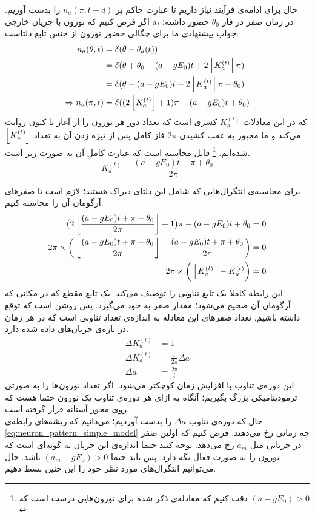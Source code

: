 حال برای ادامه‌ی فرآیند نیاز داریم تا عبارت حاکم بر 
$n_a(\pi,t-d)$
را بدست آوریم. اگر فرض کنیم که نورون با جریان خارجی a، در زمان صفر در فاز
$\theta_0$
حضور داشته؛ جواب پیشنهادی ما برای چگالی حضور نورون از جنس تابع دلتاست:
\begin{align}
	n_a(\theta,t) &= \delta(\theta - \theta_a(t)) \\
	&= \delta(\theta + \theta_0 - (a - g E_0)t + 2 \left\lfloor K^{(t)}_a \right\rfloor\pi )\\
	&= \delta( \theta - (a - g E_0)t + 2 \left\lfloor K^{(t)}_a \right\rfloor \pi + \theta_0  )\\
	\Rightarrow n_a(\pi,t) &= \delta(  (2\left\lfloor K^{(t)}_a \right\rfloor + 1)\pi - (a - g E_0)t + \theta_0   )\\
\end{align}
که در این معادلات 
$K^{(t)}_a$
کسری است که تعداد دور هر نورون را از آغاز تا کنون روایت می‌کند و ما مجبور به عقب کشیدن 
$2\pi$
فاز کامل پس از تیزه زدن آن به تعداد 
$\left\lfloor K^{(t)}_a \right\rfloor$
شده‌ایم.
\footnote{دقت کنیم که معادله‌ی ذکر شده برای نورون‌هایی درست است که 
	$(a - g E_0) > 0 $
}
قابل محاسبه است که عبارت کامل آن به صورت زیر است.
\begin{equation}
	K^{(t)}_a = \frac{(a - gE_0)t + \pi + \theta_0}{2\pi}
\end{equation}

برای محاسبه‌ی انتگرال‌هایی که شامل این دلتای دیراک هستند؛ لازم است تا صفر‌های آرگومان آن را محاسبه کنیم.
\begin{align}
	\big( 2 \left\lfloor \frac{(a - gE_0)t + \pi + \theta_0}{2\pi} \right\rfloor + 1 \big)\pi - (a - g E_0)t + \theta_0 &= 0\\
	2\pi \times \bigg( \left\lfloor \frac{(a - gE_0)t + \pi + \theta_0}{2\pi} \right\rfloor  - \frac{(a - gE_0)t + \pi + \theta_0}{2\pi} \bigg) &= 0\\
	2\pi \times \bigg( \left\lfloor K^{(t)}_a \right\rfloor - K^{(t)}_a \bigg) &= 0  \label{eq:neuron_pattern_simple_model}
\end{align}
این رابطه کاملا یک تابع تناوبی را توصیف می‌کند. یک تابع مقطع که در مکانی که آرگومان آن صحیح می‌شود؛ مقدار صفر به خود می‌گیرد. پس روشن است که توقع داشته باشیم. تعداد صفرهای این معادله به اندازه‌ی تعداد تناوبی است که در هر زمان در بازه‌ی جریان‌های داده شده دارد.
\begin{align}
	\Delta K^{(t)}_a  &= 1\\
	\Delta K^{(t)}_a &= \frac{t}{2\pi}\Delta a\\
	\Delta a &= \frac{2\pi}{t}
\end{align}
این دوره‌ی تناوب با افزایش زمان کوچکتر می‌شود. اگر تعداد نورون‌ها را به صورتی ترمودینامیکی بزرگ بگیریم؛ آنگاه به ازای هر دوره‌ی تناوب یک نورون حتما هست که روی محور آستانه قرار گرفته است.\\
حال که دوره‌ی تناوب 
$\Delta a$
را بدست آوردیم؛ می‌دانیم که ریشه‌های رابطه‌ی 
\ref{eq:neuron_pattern_simple_model}
چه زمانی رخ می‌دهند. فرض کنیم که اولین صفر در جریانی مثل
$a_m$
رخ می‌دهد. توجه کنید حتما اندازه‌ی این جریان به گونه‌ای است که نورون را به صورت فعال نگه دارد. پس باید حتما
$(a_m - g E_0) > 0 $
باشد.
حال می‌توانیم انتگرال‌های مورد نظر خود را این چنین بسط دهیم.

